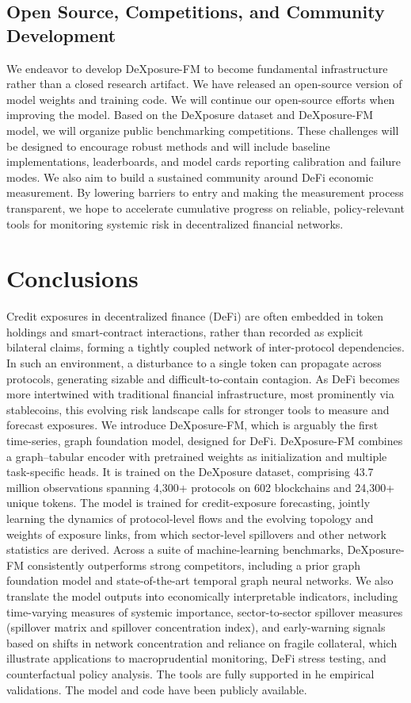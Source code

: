\subsection{Open Source, Competitions, and Community Development}
We endeavor to develop DeXposure-FM to become fundamental infrastructure rather than a closed research artifact. We have released an open-source version of model weights and training code. We will continue our open-source efforts when improving the model. Based on the DeXposure dataset and DeXposure-FM model, we will organize public benchmarking competitions. These challenges will be designed to encourage robust methods and will include baseline implementations, leaderboards, and model cards reporting calibration and failure modes. We also aim to build a sustained community around DeFi economic measurement. By lowering barriers to entry and making the measurement process transparent, we hope to accelerate cumulative progress on reliable, policy-relevant tools for monitoring systemic risk in decentralized financial networks.

\section{Conclusions}
\label{sec:conclusion}

Credit exposures in decentralized finance (DeFi) are often embedded in token holdings and smart-contract interactions, rather than recorded as explicit bilateral claims, forming a tightly coupled network of inter-protocol dependencies. In such an environment, a disturbance to a single token can propagate across protocols, generating sizable and difficult-to-contain contagion. As DeFi becomes more intertwined with traditional financial infrastructure, most prominently via stablecoins, this evolving risk landscape calls for stronger tools to measure and forecast exposures. We introduce DeXposure-FM, which is arguably the first time-series, graph foundation model, designed for DeFi. DeXposure-FM combines a graph–tabular encoder with pretrained weights as initialization and multiple task-specific heads. It is trained on the DeXposure dataset, comprising 43.7 million observations spanning 4,300+ protocols on 602 blockchains and 24,300+ unique tokens. The model is trained for credit-exposure forecasting, jointly learning the dynamics of protocol-level flows and the evolving topology and weights of exposure links, from which sector-level spillovers and other network statistics are derived. Across a suite of machine-learning benchmarks, DeXposure-FM consistently outperforms strong competitors, including a prior graph foundation model and state-of-the-art temporal graph neural networks. We also translate the model outputs into economically interpretable indicators, including time-varying measures of systemic importance, sector-to-sector spillover measures (spillover matrix and spillover concentration index), and early-warning signals based on shifts in network concentration and reliance on fragile collateral, which illustrate applications to macroprudential monitoring, DeFi stress testing, and counterfactual policy analysis. The tools are fully supported in he empirical validations. The model and code have been publicly available.


